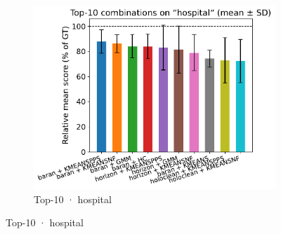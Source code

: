 \documentclass[10pt]{article} %
\numberwithin{equation}{section}
\begin{document}
\begin{figure}[htbp]
  \begin{subfigure}{0.32\linewidth}
    \centering
    \includegraphics[width=\linewidth]{figures/5.3.1graph/top10_bar_error_hospital.pdf}
    \caption{Top-10 · hospital}
  \end{subfigure}


\end{figure}
\end{document}
